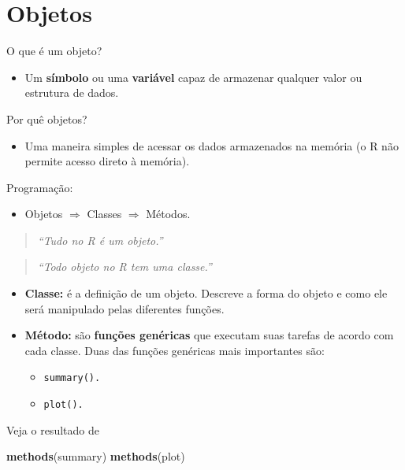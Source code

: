 \documentclass[10pt,a4paper]{book}
\newenvironment{Shaded}{\begin{snugshade}}{\end{snugshade}}
\newcommand{\KeywordTok}[1]{\textcolor[rgb]{0.13,0.29,0.53}{\textbf{#1}}}
\newcommand{\NormalTok}[1]{#1}
\providecommand{\tightlist}{%
  \setlength{\itemsep}{0pt}\setlength{\parskip}{0pt}}
\begin{document}
\section{Objetos}\label{objetos}

O que é um objeto?

\begin{itemize}
\tightlist
\item
  Um \textbf{símbolo} ou uma \textbf{variável} capaz de armazenar
  qualquer valor ou estrutura de dados.
\end{itemize}

Por quê objetos?

\begin{itemize}
\tightlist
\item
  Uma maneira simples de acessar os dados armazenados na memória (o R
  não permite acesso direto à memória).
\end{itemize}

Programação:

\begin{itemize}
\tightlist
\item
  Objetos \(\Rightarrow\) Classes \(\Rightarrow\) Métodos.
\end{itemize}

\begin{quote}
\emph{``Tudo no R é um objeto.''}
\end{quote}

\begin{quote}
\emph{``Todo objeto no R tem uma classe.''}
\end{quote}

\begin{itemize}
\tightlist
\item
  \textbf{Classe:} é a definição de um objeto. Descreve a forma do
  objeto e como ele será manipulado pelas diferentes funções.
\item
  \textbf{Método:} são \textbf{funções genéricas} que executam suas
  tarefas de acordo com cada classe. Duas das funções genéricas mais
  importantes são:

  \begin{itemize}
  \tightlist
  \item
    \texttt{summary().}
  \item
    \texttt{plot().}
  \end{itemize}
\end{itemize}

Veja o resultado de

\begin{Shaded}
\begin{Highlighting}[]
\KeywordTok{methods}\NormalTok{(summary)}
\KeywordTok{methods}\NormalTok{(plot)}
\end{Highlighting}
\end{Shaded}
\end{document}
